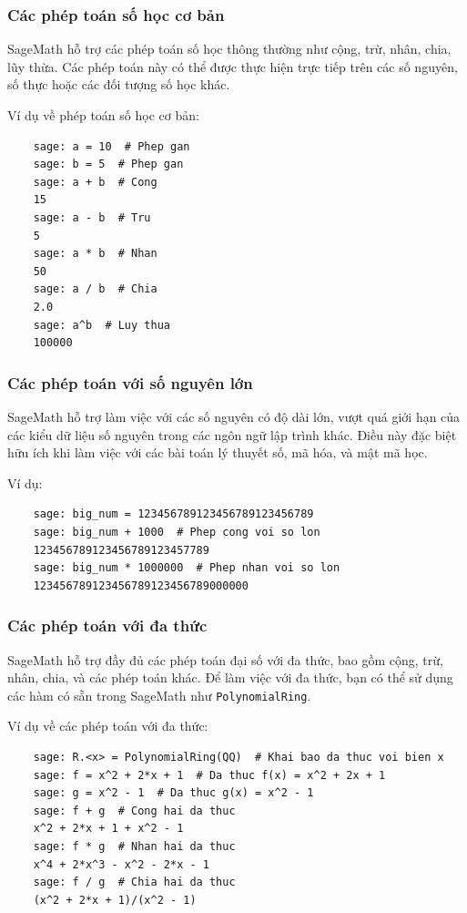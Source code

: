 \subsubsection{Các phép toán số học cơ bản}

SageMath hỗ trợ các phép toán số học thông thường như cộng, trừ, nhân, chia, lũy thừa. Các phép toán này có thể được thực hiện trực tiếp trên các số nguyên, số thực hoặc các đối tượng số học khác.

Ví dụ về phép toán số học cơ bản:

\begin{lstlisting}
	sage: a = 10  # Phep gan
	sage: b = 5  # Phep gan
	sage: a + b  # Cong
	15
	sage: a - b  # Tru
	5
	sage: a * b  # Nhan
	50
	sage: a / b  # Chia
	2.0
	sage: a^b  # Luy thua
	100000
\end{lstlisting}

\subsubsection{Các phép toán với số nguyên lớn}

SageMath hỗ trợ làm việc với các số nguyên có độ dài lớn, vượt quá giới hạn của các kiểu dữ liệu số nguyên trong các ngôn ngữ lập trình khác. Điều này đặc biệt hữu ích khi làm việc với các bài toán lý thuyết số, mã hóa, và mật mã học.

Ví dụ:

\begin{lstlisting}
	sage: big_num = 123456789123456789123456789
	sage: big_num + 1000  # Phep cong voi so lon
	123456789123456789123457789
	sage: big_num * 1000000  # Phep nhan voi so lon
	123456789123456789123456789000000
\end{lstlisting}

\subsubsection{Các phép toán với đa thức}

SageMath hỗ trợ đầy đủ các phép toán đại số với đa thức, bao gồm cộng, trừ, nhân, chia, và các phép toán khác. Để làm việc với đa thức, bạn có thể sử dụng các hàm có sẵn trong SageMath như \texttt{PolynomialRing}.

Ví dụ về các phép toán với đa thức:

\begin{lstlisting}
	sage: R.<x> = PolynomialRing(QQ)  # Khai bao da thuc voi bien x
	sage: f = x^2 + 2*x + 1  # Da thuc f(x) = x^2 + 2x + 1
	sage: g = x^2 - 1  # Da thuc g(x) = x^2 - 1
	sage: f + g  # Cong hai da thuc
	x^2 + 2*x + 1 + x^2 - 1
	sage: f * g  # Nhan hai da thuc
	x^4 + 2*x^3 - x^2 - 2*x - 1
	sage: f / g  # Chia hai da thuc
	(x^2 + 2*x + 1)/(x^2 - 1)
\end{lstlisting}

